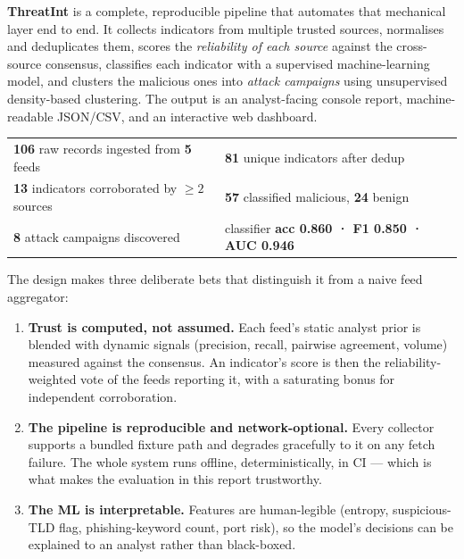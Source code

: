 \documentclass[11pt,a4paper]{article}
\begin{document}
\textbf{ThreatInt} is a complete, reproducible pipeline that automates that
mechanical layer end to end. It collects indicators from multiple trusted
sources, normalises and deduplicates them, scores the \emph{reliability of each
source} against the cross-source consensus, classifies each indicator with a
supervised machine-learning model, and clusters the malicious ones into
\emph{attack campaigns} using unsupervised density-based clustering. The output
is an analyst-facing console report, machine-readable JSON/CSV, and an
interactive web dashboard.

\begin{keybox}
\begin{tabularx}{\linewidth}{@{}lX@{}}
\textbf{106} raw records ingested from \textbf{5} feeds &
\textbf{81} unique indicators after dedup \\
\textbf{13} indicators corroborated by $\geq 2$ sources &
\textbf{57} classified malicious, \textbf{24} benign \\
\textbf{8} attack campaigns discovered &
classifier \textbf{acc 0.860 · F1 0.850 · AUC 0.946} \\
\end{tabularx}
\end{keybox}

\noindent The design makes three deliberate bets that distinguish it from a
naive feed aggregator:

\begin{enumerate}[leftmargin=1.4em,itemsep=2pt]
  \item \textbf{Trust is computed, not assumed.} Each feed's static analyst
        prior is blended with dynamic signals (precision, recall, pairwise
        agreement, volume) measured against the consensus. An indicator's
        score is then the reliability-weighted vote of the feeds reporting it,
        with a saturating bonus for independent corroboration.
  \item \textbf{The pipeline is reproducible and network-optional.} Every
        collector supports a bundled fixture path and degrades gracefully to it
        on any fetch failure. The whole system runs offline, deterministically,
        in CI --- which is what makes the evaluation in this report trustworthy.
  \item \textbf{The ML is interpretable.} Features are human-legible (entropy,
        suspicious-TLD flag, phishing-keyword count, port risk), so the model's
        decisions can be explained to an analyst rather than black-boxed.
\end{enumerate}
\end{document}
